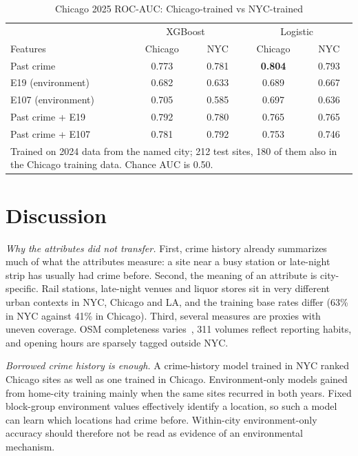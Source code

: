 \documentclass[conference]{IEEEtran}
\begin{document}
\begin{table}[t]
\caption{Chicago 2025 ROC-AUC: Chicago-trained vs NYC-trained}
\label{tab:home}
\centering
\setlength{\tabcolsep}{4pt}
\begin{tabular}{lcccc}
\toprule
& \multicolumn{2}{c}{XGBoost} & \multicolumn{2}{c}{Logistic} \\
Features & Chicago & NYC & Chicago & NYC \\
\midrule
Past crime & 0.773 & 0.781 & \textbf{0.804} & 0.793 \\
E19 (environment) & 0.682 & 0.633 & 0.689 & 0.667 \\
E107 (environment) & 0.705 & 0.585 & 0.697 & 0.636 \\
Past crime + E19 & 0.792 & 0.780 & 0.765 & 0.765 \\
Past crime + E107 & 0.781 & 0.792 & 0.753 & 0.746 \\
\bottomrule
\multicolumn{5}{p{7.6cm}}{\footnotesize Trained on 2024 data from the named city; 212 test sites, 180 of them
also in the Chicago training data. Chance AUC is 0.50.}
\end{tabular}
\end{table}

\section{Discussion}
\textit{Why the attributes did not transfer.} First, crime history already summarizes much of what the attributes
measure: a site near a busy station or late-night strip has usually had crime before. Second, the meaning of an
attribute is city-specific. Rail stations, late-night venues and liquor stores sit in very different urban contexts
in NYC, Chicago and LA, and the training base rates differ (63\% in NYC against 41\% in Chicago). Third, several
measures are proxies with uneven coverage. OSM completeness varies~\cite{haklay2010}, 311 volumes reflect reporting
habits, and opening hours are sparsely tagged outside NYC.

\textit{Borrowed crime history is enough.} A crime-history model trained in NYC ranked Chicago sites as well
as one trained in Chicago. Environment-only models gained from home-city training mainly when the same sites recurred
in both years. Fixed block-group environment values effectively identify a location, so such a model can learn
which locations had crime before. Within-city environment-only accuracy should therefore not be read as evidence of
an environmental mechanism.
\end{document}

